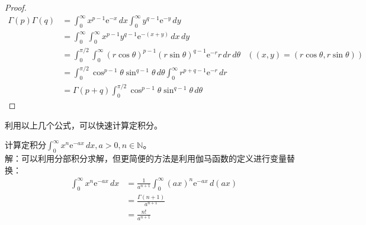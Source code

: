 \begin{proof}
    \begin{align*}
    \Gamma (p)\Gamma (q)&=\int_{0}^{\infty}x^{p-1}\mathrm{e}^{-x}\,dx\int_{0}^{\infty}y^{q-1}\mathrm{e}^{-y}\,dy\\
    &=\int_{0}^{\infty}\int_{0}^{\infty}x^{p-1}y^{q-1}\mathrm{e}^{-(x+y)}\,dx\,dy\\
    &=\int_{0}^{\pi/2}\int_{0}^{\infty}(r\cos\theta)^{p-1}(r\sin\theta)^{q-1}\mathrm{e}^{-r}r\,dr\,d\theta&\left((x,y)=(r\cos\theta,r\sin\theta)\right)\\
    &=\int_{0}^{\pi/2}\cos^{p-1}\theta\sin^{q-1}\theta\,d\theta\int_{0}^{\infty}r^{p+q-1}\mathrm{e}^{-r}\,dr\\
    &=\Gamma (p+q)\int_{0}^{\pi/2}\cos^{p-1}\theta\sin^{q-1}\theta\,d\theta
    \end{align*}
\end{proof}

利用以上几个公式，可以快速计算定积分。

\begin{example}[伽马函数的变形]
    计算定积分$\int_{0}^{\infty}x^{n}\mathrm{e}^{-ax}\,dx,a>0,n\in\mathbb{N}$。\\
解：可以利用分部积分求解，但更简便的方法是利用伽马函数的定义进行变量替换：
    \begin{align*}
        \int_{0}^{\infty}x^{n}\mathrm{e}^{-ax}\,dx&=\frac{1}{a^{n+1}}\int_{0}^{\infty}(ax)^{n}\mathrm{e}^{-ax}\,d(ax)\\
        &=\frac{\Gamma (n+1)}{a^{n+1}}\\
        &=\frac{n!}{a^{n+1}}
    \end{align*}
\end{example}


